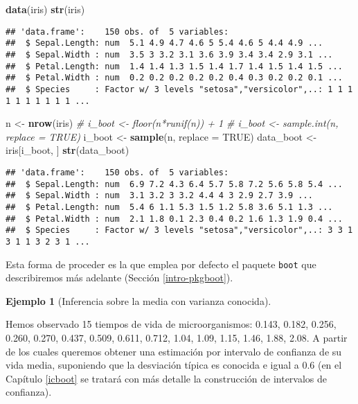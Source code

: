 \documentclass[
]{book}
\newenvironment{Shaded}{\begin{snugshade}}{\end{snugshade}}
\newcommand{\CommentTok}[1]{\textcolor[rgb]{0.56,0.35,0.01}{\textit{#1}}}
\newcommand{\DataTypeTok}[1]{\textcolor[rgb]{0.13,0.29,0.53}{#1}}
\newcommand{\KeywordTok}[1]{\textcolor[rgb]{0.13,0.29,0.53}{\textbf{#1}}}
\newcommand{\NormalTok}[1]{#1}
\newcommand{\OtherTok}[1]{\textcolor[rgb]{0.56,0.35,0.01}{#1}}
\newcommand{\StringTok}[1]{\textcolor[rgb]{0.31,0.60,0.02}{#1}}
\theoremstyle{break}
\theoremstyle{definition}
\theoremstyle{definition}
\newtheorem{example}{Ejemplo}[chapter]
\theoremstyle{definition}
\theoremstyle{remark}
\begin{document}
\begin{Shaded}
\begin{Highlighting}[]
\KeywordTok{data}\NormalTok{(iris)}
\KeywordTok{str}\NormalTok{(iris)}
\end{Highlighting}
\end{Shaded}

\begin{verbatim}
## 'data.frame':    150 obs. of  5 variables:
##  $ Sepal.Length: num  5.1 4.9 4.7 4.6 5 5.4 4.6 5 4.4 4.9 ...
##  $ Sepal.Width : num  3.5 3 3.2 3.1 3.6 3.9 3.4 3.4 2.9 3.1 ...
##  $ Petal.Length: num  1.4 1.4 1.3 1.5 1.4 1.7 1.4 1.5 1.4 1.5 ...
##  $ Petal.Width : num  0.2 0.2 0.2 0.2 0.2 0.4 0.3 0.2 0.2 0.1 ...
##  $ Species     : Factor w/ 3 levels "setosa","versicolor",..: 1 1 1 1 1 1 1 1 1 1 ...
\end{verbatim}

\begin{Shaded}
\begin{Highlighting}[]
\NormalTok{n <-}\StringTok{ }\KeywordTok{nrow}\NormalTok{(iris)}
\CommentTok{# i_boot <- floor(n*runif(n)) + 1}
\CommentTok{# i_boot <- sample.int(n, replace = TRUE)}
\NormalTok{i_boot <-}\StringTok{ }\KeywordTok{sample}\NormalTok{(n, }\DataTypeTok{replace =} \OtherTok{TRUE}\NormalTok{)}
\NormalTok{data_boot <-}\StringTok{ }\NormalTok{iris[i_boot, ]}
\KeywordTok{str}\NormalTok{(data_boot)}
\end{Highlighting}
\end{Shaded}

\begin{verbatim}
## 'data.frame':    150 obs. of  5 variables:
##  $ Sepal.Length: num  6.9 7.2 4.3 6.4 5.7 5.8 7.2 5.6 5.8 5.4 ...
##  $ Sepal.Width : num  3.1 3.2 3 3.2 4.4 4 3 2.9 2.7 3.9 ...
##  $ Petal.Length: num  5.4 6 1.1 5.3 1.5 1.2 5.8 3.6 5.1 1.3 ...
##  $ Petal.Width : num  2.1 1.8 0.1 2.3 0.4 0.2 1.6 1.3 1.9 0.4 ...
##  $ Species     : Factor w/ 3 levels "setosa","versicolor",..: 3 3 1 3 1 1 3 2 3 1 ...
\end{verbatim}

Esta forma de proceder es la que emplea por defecto el paquete \texttt{boot} que
describiremos más adelante (Sección \ref{intro-pkgboot}).

\begin{example}[Inferencia sobre la media con varianza conocida]
\protect\hypertarget{exm:media-dt-conocida}{}{\label{exm:media-dt-conocida} \iffalse (Inferencia sobre la media con varianza conocida) \fi{} }
\vspace{0.5cm}

Hemos observado 15 tiempos de vida de microorganismos:
0.143, 0.182, 0.256, 0.260, 0.270, 0.437, 0.509,
0.611, 0.712, 1.04, 1.09, 1.15, 1.46, 1.88, 2.08.
A partir de los cuales queremos
obtener una estimación por intervalo de confianza de su vida media,
suponiendo que la desviación típica es conocida e igual a 0.6
(en el Capítulo \ref{icboot} se tratará con más detalle la construcción de intervalos de confianza).
\end{example}
\end{document}
